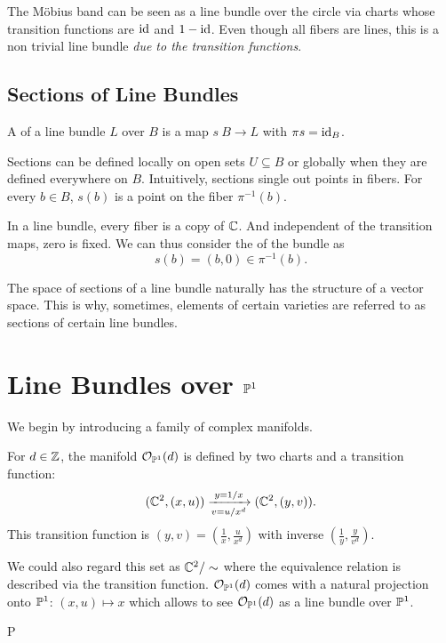 \documentclass[12pt]{memoir}
\def\nextra {P}
\begin{document}
    \begin{Ex}
        The M\"obius band can be seen as a line bundle over the circle via charts whose transition functions are $\operatorname{id}$ and $1-\operatorname{id}$. Even though all fibers are lines, this is a non trivial line bundle \emph{due to the transition functions}.
    \end{Ex}
    \subsection{Sections of Line Bundles}

    \begin{Def}
        A  of a line bundle $L$ over $B$ is a map $s\:B\to L$ with $\pi s=\operatorname{id}_B$. 
    \end{Def}
    
    Sections can be defined locally on open sets $U\subseteq B$ or globally when they are defined everywhere on $B$. Intuitively, sections single out points in fibers. For every $b\in B$, $s(b)$ is a point on the fiber $\pi^{-1}(b)$.

    \begin{Ex}
        In a line bundle, every fiber is a copy of $\mathbb{C}$. And independent of the transition maps, zero is fixed. We can thus consider the  of the bundle as 
        $$s(b)=(b,0)\in\pi^{-1}(b).$$
    \end{Ex}

    The space of sections of a line bundle naturally has the structure of a vector space. This is why, sometimes, elements of certain varieties are referred to as sections of certain line bundles. 

    \section{Line Bundles over $\mathbb{P}^1$}

    We begin by introducing a family of complex manifolds.

\begin{Def}
    For $d\in\mathbb{Z}$, the manifold $\mathcal{O}_{\mathbb{P}^1}(d)$ is defined by two charts and a transition function:
    $$(\mathbb{C}^2,(x,u))\xrightarrow[v=u/x^d]{y=1/x}(\mathbb{C}^2,(y,v)).$$
    This transition function is  $(y,v)=\left(\frac{1}{x},\frac{u}{x^d}\right)$ with inverse $\left(\frac{1}{y},\frac{y}{v^d}\right)$.
\end{Def}

We could also regard this set as $\mathbb{C}^2/\sim$ where the equivalence relation is described via the transition function. $\mathcal{O}_{\mathbb{P}^1}(d)$ comes with a natural projection onto $\mathbb{P}^1$: $(x,u)\mapsto x$ which allows to see $\mathcal{O}_{\mathbb{P}^1}(d)$ as a line bundle over $\mathbb{P}^1$. 


    
\ifx\nextra\undefined
\printindex
\else\fi
\nocite{*}


\end{document}

